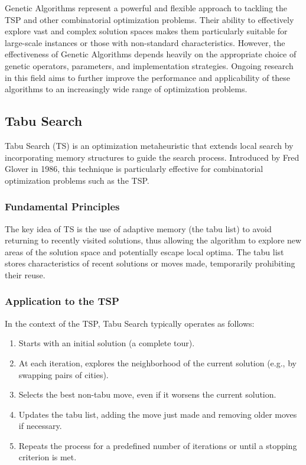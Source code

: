 Genetic Algorithms represent a powerful and flexible approach to tackling the \Gls{TSP} and other combinatorial optimization problems. Their ability to effectively explore vast and complex solution spaces makes them particularly suitable for large-scale instances or those with non-standard characteristics. However, the effectiveness of Genetic Algorithms depends heavily on the appropriate choice of genetic operators, parameters, and implementation strategies. Ongoing research in this field aims to further improve the performance and applicability of these algorithms to an increasingly wide range of optimization problems.

\subsection{Tabu Search}

Tabu Search (\Gls{TS}) is an optimization metaheuristic that extends local search by incorporating memory structures to guide the search process. Introduced by Fred Glover in 1986, this technique is particularly effective for combinatorial optimization problems such as the \Gls{TSP}.

\subsubsection{Fundamental Principles}

The key idea of \Gls{TS} is the use of adaptive memory (the tabu list) to avoid returning to recently visited solutions, thus allowing the algorithm to explore new areas of the solution space and potentially escape local optima. The tabu list stores characteristics of recent solutions or moves made, temporarily prohibiting their reuse.

\subsubsection{Application to the \Gls{TSP}}

In the context of the \Gls{TSP}, Tabu Search typically operates as follows:

\begin{enumerate}
	\item Starts with an initial solution (a complete tour).
	\item At each iteration, explores the neighborhood of the current solution (e.g., by swapping pairs of cities).
	\item Selects the best non-tabu move, even if it worsens the current solution.
	\item Updates the tabu list, adding the move just made and removing older moves if necessary.
	\item Repeats the process for a predefined number of iterations or until a stopping criterion is met.
\end{enumerate}

